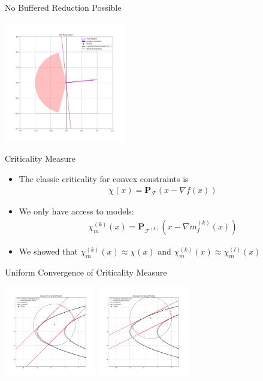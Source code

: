 \documentclass{beamer}
\newcommand{\feasible}{\mathcal F}
\newcommand{\feasiblek}{\mathcal F^{(k)}}
\newcommand{\proj}{\textbf{P}}
\begin{document}
\begin{frame}{No Buffered Reduction Possible}
	\begin{center}
		\includegraphics[width=200px]{images/no_reduction.png}
	\end{center}
\end{frame}


\begin{frame}{Criticality Measure}
	\begin{itemize}
		\item The classic criticality for convex constraints is
\begin{align*}
\chi(x) = \proj_{\feasible}\left(x - \nabla f(x)\right)
\end{align*}
		\item We only have access to models:
\begin{align*}
\chi_m^{(k)}(x) = \proj_{\feasiblek}\left(x - \nabla m_f^{(k)}(x)\right)
\end{align*}
		\item We showed that $\chi_m^{(k)}(x) \approx \chi(x)$ and $\chi_m^{(k)}(x) \approx \chi_m^{(l)}(x)$
	\end{itemize}
\end{frame}



\begin{frame}{Uniform Convergence of Criticality Measure}
	\begin{center}
		\includegraphics[width=150px]{images/modeled_constraints_2.png}
		\includegraphics[width=150px]{images/modeled_constraints_3.png}
	\end{center}
\end{frame}
\end{document}
